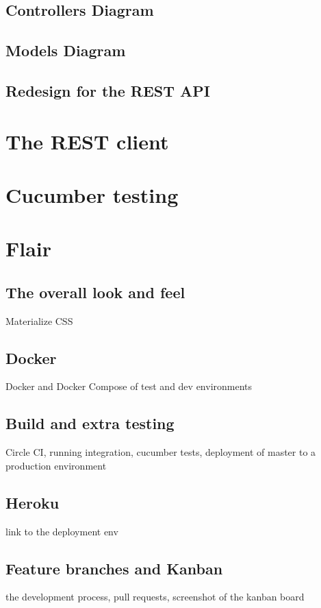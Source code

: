 \documentclass[a4paper, 11pt, titlepage]{article}
\begin{document}
\begin{landscape}
  \subsection{Controllers Diagram}

  \subsection{Models Diagram}
\end{landscape}

\subsection{Redesign for the REST API}


\section{The REST client}

\section{Cucumber testing}

\section{Flair}
\subsection{The overall look and feel}
Materialize CSS

\subsection{Docker}
Docker and Docker Compose of test and dev environments

\subsection{Build and extra testing}
Circle CI, running integration, cucumber tests, deployment of master to a production environment

\subsection{Heroku}
link to the deployment env

\subsection{Feature branches and Kanban}
the development process, pull requests, screenshot of the kanban board
\end{document}
